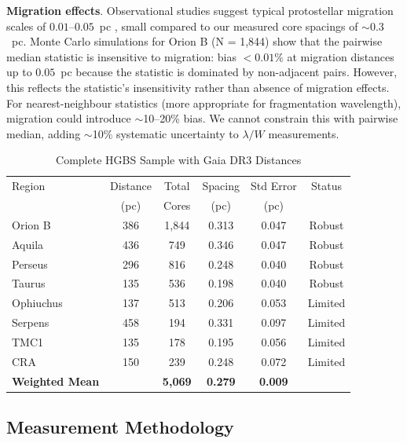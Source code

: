 \documentclass[twocolumn,longtitle,usenatbib]{mnras}
\begin{document}
\textbf{Migration effects}. Observational studies suggest typical protostellar migration scales of $0.01$--$0.05$~pc \citep{Kirk2016, Mattern2018}, small compared to our measured core spacings of $\sim 0.3$~pc. Monte Carlo simulations for Orion B (N = 1,844) show that the pairwise median statistic is insensitive to migration: bias $< 0.01\%$ at migration distances up to $0.05$~pc because the statistic is dominated by non-adjacent pairs. However, this reflects the statistic's insensitivity rather than absence of migration effects. For nearest-neighbour statistics (more appropriate for fragmentation wavelength), migration could introduce $\sim$10--20\% bias. We cannot constrain this with pairwise median, adding $\sim$10\% systematic uncertainty to $\lambda/W$ measurements.

\begin{table}
\caption{Complete HGBS Sample with Gaia DR3 Distances}
\label{tab:sample}
\begin{tabular}{lccccc}
\toprule
Region & Distance & Total & Spacing & Std Error & Status \\
       & (pc)   & Cores & (pc)   & (pc)      &  \\
\midrule
Orion B  & 386 & 1,844 & 0.313 & 0.047 & Robust \\
Aquila   & 436 & 749   & 0.346 & 0.047 & Robust \\
Perseus  & 296 & 816   & 0.248 & 0.040 & Robust \\
Taurus   & 135 & 536   & 0.198 & 0.040 & Robust \\
Ophiuchus& 137 & 513   & 0.206 & 0.053 & Limited \\
Serpens  & 458 & 194   & 0.331 & 0.097 & Limited \\
TMC1     & 135 & 178   & 0.195 & 0.056 & Limited \\
CRA      & 150 & 239   & 0.248 & 0.072 & Limited \\
\midrule
\textbf{Weighted Mean} &  & \textbf{5,069} & \textbf{0.279} & \textbf{0.009} &  \\
\bottomrule
\end{tabular}
\end{table}

\subsection{Measurement Methodology}
\end{document}
